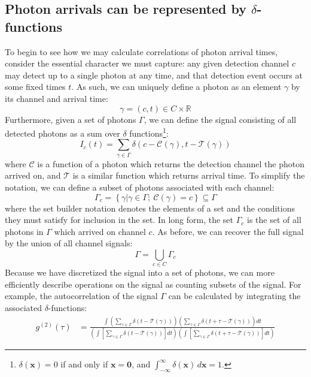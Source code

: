 \documentclass{article}
\newcommand{\braces}[1]{\ensuremath{\left\lbrace #1 \right\rbrace}}
\newcommand{\brackets}[1]{\ensuremath{\left[ #1 \right]}}
\newcommand{\setbuilder}[2]{\ensuremath{\braces{#1 \left| #2 \right.}}}
\newcommand{\gn}[1]{\ensuremath{g^{(#1)}}}
\newcommand{\reals}{\ensuremath{\mathbb{R}}}
\renewcommand{\vec}{\boldsymbol}
\newcommand{\channel}{\ensuremath{c}}
\newcommand{\channels}{\ensuremath{C}}
\newcommand{\Channel}{\ensuremath{\mathcal{C}}}
\newcommand{\Time}{\ensuremath{\mathcal{T}}}
\newcommand{\photon}{\ensuremath{\gamma}}
\newcommand{\photons}{\ensuremath{\Gamma}}
\begin{document}
\subsection{Photon arrivals can be represented by $\delta$-functions}
To begin to see how we may calculate correlations of photon arrival times, consider the essential character we must capture: any given detection channel $c$ may detect up to a single photon at any time, and that detection event occurs at some fixed times $t$. As such, we can uniquely define a photon as an element $\photon$ by its channel and arrival time:
\begin{equation}
\photon=(c,t)\in\channels\times\reals
\end{equation}
Furthermore, given a set of photons $\photons$, we can define the signal consisting of all detected photons as a sum over $\delta$ functions\footnote{$\delta(\vec{x})=0$ if and only if $\vec{x}=\vec{0}$, and $\int_{-\infty}^{\infty}{\delta(\vec{x})\,d\vec{x}}=1$.}:
\begin{equation}
\label{eq:delta_function_signal}
I_{\channel}(t) = \sum_{\photon\in\photons}
                       {\delta\left(\channel-\Channel(\photon),t-\Time(\photon)\right)}
\end{equation}
where $\Channel$ is a function of a photon which returns the detection channel the photon arrived on, and $\Time$ is a similar function which returns arrival time. To simplify the notation, we can define a subset of photons associated with each channel:
\begin{equation}
\photons_{\channel} = \setbuilder{\photon}{\photon\in\photons;~\Channel(\photon)=\channel}
                      \subseteq\photons
\end{equation}
where the set builder notation denotes the elements of a set and the conditions they must satisfy for inclusion in the set. In long form, the set $\photons_{\channel}$ is the set of all photons in $\photons$ which arrived on channel $\channel$. As before, we can recover the full signal by the union of all channel signals:
\begin{equation}
\photons = \bigcup\limits_{\channel\in\channels}{\photons_{\channel}}
\end{equation}
Because we have discretized the signal into a set of photons, we can more efficiently describe operations on the signal as counting subsets of the signal. For example, the autocorrelation of the signal $\photons$ can be calculated by integrating the associated $\delta$-functions:
\begin{align}
\gn{2}(\tau) &= \frac{\int{\left(\sum_{\photon\in\photons}{\delta(t - \Time(\photon))}\right)
                    \left(\sum_{\photon\in\photons}{\delta(t+\tau-\Time(\photon))}\right)dt}}
                   {\left(
                       \int{\brackets{
                                \sum_{\photon\in\photons}
                                     {\delta(t-\Time(\photon))}}dt}\right)
                    \left(
                       \int{\brackets{
                                \sum_{\photon\in\photons}
                                     {\delta(t+\tau-\Time(\photon))}}dt}\right)}
\end{align}
\end{document}
